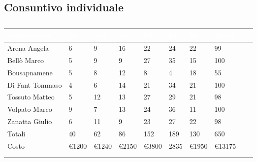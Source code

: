     \subsection{Consuntivo individuale} {
        \setlength{\freewidth}{\dimexpr\textwidth-30\tabcolsep}
            \renewcommand{\arraystretch}{1.0}
            \setlength{\aboverulesep}{0pt}
            \setlength{\belowrulesep}{0pt}
            \begin{longtable}{C{.3\freewidth} C{.1\freewidth} C{.1\freewidth} C{.1\freewidth} C{.1\freewidth} C{.1\freewidth} C{.1\freewidth} C{.1\freewidth} C{.1\freewidth} C{.4\freewidth}}
            \toprule
            \textcolor{white}{\textbf{Componente}}&
            \textcolor{white}{\textbf{Re}}&
            \textcolor{white}{\textbf{Am}}&
            \textcolor{white}{\textbf{An}}&
            \textcolor{white}{\textbf{Pt}}&
            \textcolor{white}{\textbf{Pr}}&
            \textcolor{white}{\textbf{Ve}}&
            \textcolor{white}{\textbf{Totale}} \\
        
            \toprule
            \endhead
    
            Arena Angela & 6 & 9 & 16 & 22 & 24 & 22 & 99\\      
            Bellò Marco & 5 & 9 & 9 & 27 & 35 & 15 & 100\\      
            Bousapnamene & 5 & 8 & 12 & 8 & 4 & 18 & 55\\      
            Di Fant Tommaso & 4 & 6 & 14 & 21 & 34 & 21 & 100\\      
            Tossuto Matteo & 5 & 12 & 13 & 27 & 29 & 21 & 98 \\      
            Volpato Marco & 9 & 7 & 13 & 24 & 36 & 11 &  100 \\      
            Zanatta Giulio & 6 & 11 & 9 & 23 & 27 & 22 & 98 \\      
            Totali & 40 & 62 & 86 & 152 & 189 & 130 & 650 \\
            Costo & \euro1200 & \euro1240 & \euro2150 & \euro3800 & 2835 & \euro1950 &  \euro13175 & \\
            \bottomrule
            \\
            \caption{}

            \end{longtable}
    }
